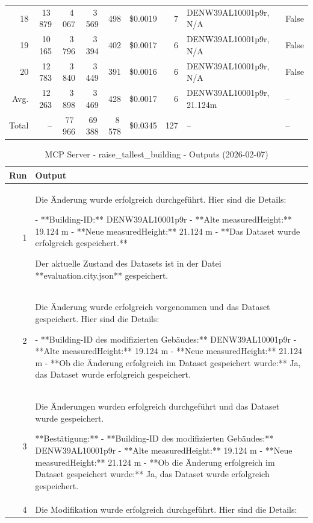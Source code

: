 \documentclass[a4paper,11pt]{article}
\begin{document}
\begin{table}[ht]
\begin{tabular}{r r r r r r r p{3cm} l}
18 & 13\,879 & 4\,067 & 3\,569 & 498 & \$0.0019 & 7 & DENW39AL10001p9r, N/A & False \\
19 & 10\,165 & 3\,796 & 3\,394 & 402 & \$0.0017 & 6 & DENW39AL10001p9r, N/A & False \\
20 & 12\,783 & 3\,840 & 3\,449 & 391 & \$0.0016 & 6 & DENW39AL10001p9r, N/A & False \\
\hline
Avg. & 12\,263 & 3\,898 & 3\,469 & 428 & \$0.0017 & 6 & DENW39AL10001p9r, 21.124m & -- \\
Total & -- & 77\,966 & 69\,388 & 8\,578 & \$0.0345 & 127 & -- & -- \\
\hline
\end{tabular}
\end{table}

\clearpage

\begin{table}[ht]
\centering
\scriptsize
\caption{MCP Server - raise\_tallest\_building - Outputs (2026-02-07)}
\label{tab:mcp\_raise\_tallest\_building\_outputs\_2026-02-07}
\begin{tabular}{r p{12cm}}
\hline
Run & Output \\
\hline
1 & Die Änderung wurde erfolgreich durchgeführt. Hier sind die Details:

- **Building-ID:** DENW39AL10001p9r
- **Alte measuredHeight:** 19.124 m
- **Neue measuredHeight:** 21.124 m
- **Das Dataset wurde erfolgreich gespeichert.**

Der aktuelle Zustand des Datasets ist in der Datei **evaluation.city.json** gespeichert. \\
2 & Die Änderung wurde erfolgreich vorgenommen und das Dataset gespeichert. Hier sind die Details:

- **Building-ID des modifizierten Gebäudes:** DENW39AL10001p9r
- **Alte measuredHeight:** 19.124 m
- **Neue measuredHeight:** 21.124 m
- **Ob die Änderung erfolgreich im Dataset gespeichert wurde:** Ja, das Dataset wurde erfolgreich gespeichert. \\
3 & Die Änderungen wurden erfolgreich durchgeführt und das Dataset wurde gespeichert. 

**Bestätigung:**
- **Building-ID des modifizierten Gebäudes:** DENW39AL10001p9r
- **Alte measuredHeight:** 19.124 m
- **Neue measuredHeight:** 21.124 m
- **Ob die Änderung erfolgreich im Dataset gespeichert wurde:** Ja, das Dataset wurde erfolgreich gespeichert. \\
4 & Die Modifikation wurde erfolgreich durchgeführt. Hier sind die Details:


\end{tabular}
\end{table}
\end{document}
